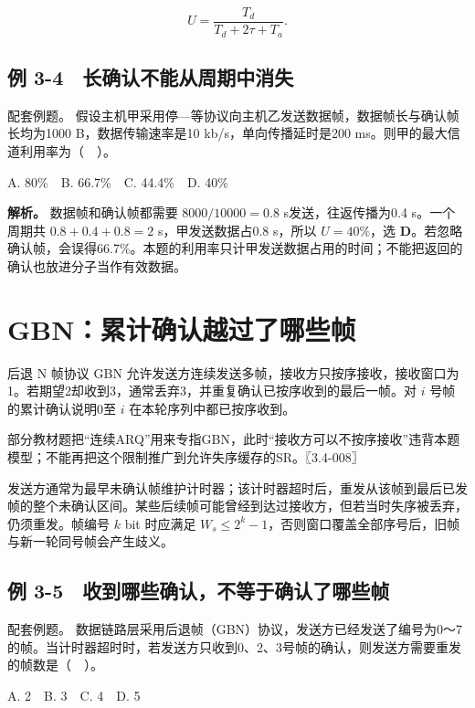 \[U=\frac{T_d}{T_d+2\tau+T_a}.\]

\subsection{例 3-4　长确认不能从周期中消失}\label{CN03-ex4}

{\begin{example}[配套例题]

配套例题。 假设主机甲采用停---等协议向主机乙发送数据帧，数据帧长与确认帧长均为1000 B，数据传输速率是10 kb/s，单向传播延时是200 ms。则甲的最大信道利用率为（　）。

A. 80\%　B. 66.7\%　C. 44.4\%　D. 40\%

\end{example}}

\textbf{解析。} 数据帧和确认帧都需要 \(8000/10000=0.8\) s发送，往返传播为0.4 s。一个周期共 \(0.8+0.4+0.8=2\) s，甲发送数据占0.8 s，所以 \(U=40\%\)，选 \textbf{D}。若忽略确认帧，会误得66.7\%。本题的利用率只计甲发送数据占用的时间；不能把返回的确认也放进分子当作有效数据。

\section{GBN：累计确认越过了哪些帧}\label{CN03-07}

后退 N 帧协议 GBN 允许发送方连续发送多帧，接收方只按序接收，接收窗口为1。若期望2却收到3，通常丢弃3，并重复确认已按序收到的最后一帧。对 \(i\) 号帧的累计确认说明0至 \(i\) 在本轮序列中都已按序收到。

部分教材题把``连续ARQ''用来专指GBN，此时``接收方可以不按序接收''违背本题模型；不能再把这个限制推广到允许失序缓存的SR。〖3.4-008〗

发送方通常为最早未确认帧维护计时器；该计时器超时后，重发从该帧到最后已发帧的整个未确认区间。某些后续帧可能曾经到达过接收方，但若当时失序被丢弃，仍须重发。帧编号 \(k\) bit 时应满足 \(W_s\le2^k-1\)，否则窗口覆盖全部序号后，旧帧与新一轮同号帧会产生歧义。

\subsection{例 3-5　收到哪些确认，不等于确认了哪些帧}\label{CN03-ex5}

{\begin{example}[配套例题]

配套例题。 数据链路层采用后退帧（GBN）协议，发送方已经发送了编号为0～7的帧。当计时器超时时，若发送方只收到0、2、3号帧的确认，则发送方需要重发的帧数是（　）。

A. 2　B. 3　C. 4　D. 5

\end{example}}

